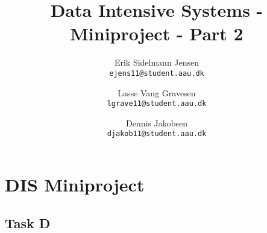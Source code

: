 

\author{
  Erik Sidelmann Jensen\\
  \texttt{ejens11@student.aau.dk}
  \and
  Lasse Vang Gravesen\\
  \texttt{lgrave11@student.aau.dk}
  \and
  Dennis Jakobsen\\
  \texttt{djakob11@student.aau.dk}  
}

\title{Data Intensive Systems - Miniproject - Part 2}
\date{}


	\clearpage\maketitle
	\thispagestyle{empty}
	
	\chapter{DIS Miniproject}
	\section{Task D}
    
	


